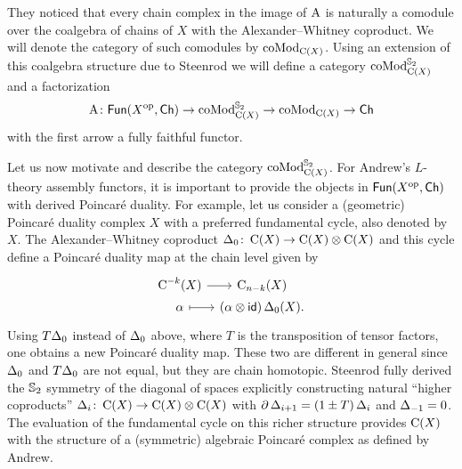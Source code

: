 They noticed that every chain complex in the image of $\operatorname{A}$ is naturally a comodule over the coalgebra of chains of $X$ with the Alexander--Whitney coproduct.
We will denote the category of such comodules by $\operatorname{coMod}_{\operatorname{C}(X)}$.
Using an extension of this coalgebra structure due to Steenrod we will define a category $\operatorname{coMod}^{\mathbb{S}_2}_{\operatorname{C}(X)}$ and a factorization
\[
\operatorname{A} \colon \mathsf{Fun}(X^{\mathrm{op}}, \mathsf{Ch}) \to \operatorname{coMod}^{\mathbb{S}_2}_{\operatorname{C}(X)} \to \operatorname{coMod}_{\operatorname{C}(X)} \to \mathsf{Ch}
\]
with the first arrow a fully faithful functor.

Let us now motivate and describe the category $\operatorname{coMod}^{\mathbb{S}_2}_{\operatorname{C}(X)}$.
For Andrew's $L$-theory assembly functors, it is important to provide the objects in $\mathsf{Fun}(X^{\mathrm{op}}, \mathsf{Ch})$ with derived Poincar\'e duality.
For example, let us consider a (geometric) Poincar\'e duality complex $X$ with a preferred fundamental cycle, also denoted by $X$.
The Alexander--Whitney coproduct $\operatorname{\Delta}_0 \colon \operatorname{C}(X) \to \operatorname{C}(X) \otimes \operatorname{C}(X)$ and this cycle define a Poincar\'e duality map at the chain level given by
\[
\begin{tikzcd}[column sep=tiny,row sep=0]
	\cochains^{-k}(X) \arrow[r] & \chains_{n-k}(X) \\
	\alpha \arrow[r,mapsto] & (\alpha \ot \id)\copr_0(X).
\end{tikzcd}
\]
Using $T\!\operatorname{\Delta}_0$ instead of $\operatorname{\Delta}_0$ above, where $T$ is the transposition of tensor factors, one obtains a new Poincar\'e duality map.
These two are different in general since $\operatorname{\Delta}_0$ and $T\!\operatorname{\Delta}_0$ are not equal, but they are chain homotopic.
Steenrod \cite{steenrod1947products} fully derived the $\mathbb{S}_2$ symmetry of the diagonal of spaces explicitly constructing natural ``higher coproducts'' $\operatorname{\Delta}_i \colon \operatorname{C}(X) \to \operatorname{C}(X) \otimes \operatorname{C}(X)$ with $\partial \operatorname{\Delta}_{i+1} = (1 \pm T) \operatorname{\Delta}_i$ and $\operatorname{\Delta}_{-1} = 0$.
The evaluation of the fundamental cycle on this richer structure provides $\operatorname{C}(X)$ with the structure of a (symmetric) algebraic Poincar\'e complex as defined by Andrew.

